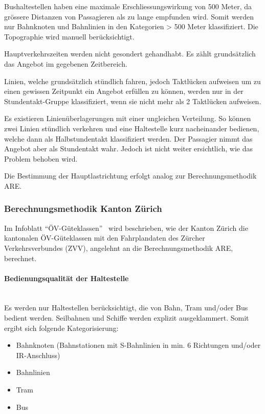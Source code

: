 Bushaltestellen haben eine maximale Erschliessungswirkung von 500 Meter, da grössere Distanzen von Passagieren als zu lange empfunden wird.
Somit werden nur Bahnknoten und Bahnlinien in den Kategorien > 500 Meter klassifiziert.
Die Topographie wird manuell berücksichtigt.

Hauptverkehrszeiten werden nicht gesondert gehandhabt.
Es zählt grundsätzlich das Angebot im gegebenen Zeitbereich.

Linien, welche grundsätzlich stündlich fahren, jedoch Taktlücken aufweisen um zu einen gewissen Zeitpunkt ein Angebot erfüllen zu können, werden nur in der Stundentakt-Gruppe klassifiziert, wenn sie nicht mehr als 2 Taktlücken aufweisen.

Es existieren Linienüberlagerungen mit einer ungleichen Verteilung.
So können zwei Linien stündlich verkehren und eine Haltestelle kurz nacheinander bedienen, welche dann als Halbstundentakt klassifiziert werden.
Der Passagier nimmt das Angebot aber als Stundentakt wahr.
Jedoch ist nicht weiter ersichtlich, wie das Problem behoben wird.

Die Bestimmung der Hauptlastrichtung erfolgt analog zur Berechnungsmethodik ARE.


\subsubsection{Berechnungsmethodik Kanton Zürich}
\label{Lösungsansätze:Berechnungsmethodik Kanton Zürich}
Im Infoblatt "`ÖV-Güteklassen"'~\cite{oev-guteklassen-zh} wird beschrieben, wie der Kanton Zürich die kantonalen ÖV-Güteklassen mit den Fahrplandaten des Zürcher Verkehrsverbundes (ZVV), angelehnt an die Berechnungsmethodik \acs{ARE}, berechnet.

\paragraph{Bedienungsqualität der Haltestelle}~\\
\label{Berechnungsmethodik Kanton Zürich:Bedienungsqualität der Haltestelle}
Es werden nur Haltestellen berücksichtigt, die von Bahn, Tram und/oder Bus bedient werden.
Seilbahnen und Schiffe werden explizit ausgeklammert.
Somit ergibt sich folgende Kategorisierung:
\begin{itemize}
    \itemsep -1.5em
    \item Bahnknoten (Bahnstationen mit S-Bahnlinien in min. 6 Richtungen und/oder IR-Anschluss)
    \item Bahnlinien
    \item Tram
    \item Bus
\end{itemize}

